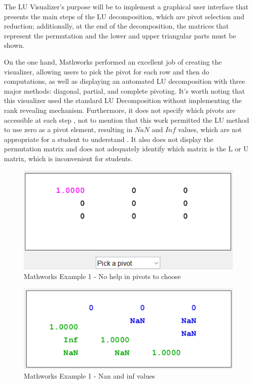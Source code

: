 The LU Visualizer's purpose will be to implement a graphical user interface that presents the main steps of the LU decomposition, which are pivot selection and reduction; additionally, at the end of the decomposition, the matrices that represent the permutation and the lower and upper triangular parts must be shown. 

On the one hand, Mathworks performed an excellent job of creating the visualizer, allowing users to pick the pivot for each row and then do computations, as well as displaying an automated LU decomposition with three major methods: diagonal, partial, and complete pivoting. It's worth noting that this visualizer used the standard LU Decomposition without implementing the rank revealing mechanism. Furthermore, it does not specify which pivots are accessible at each step , not to mention that this work permitted the LU method to use zero as a pivot element, resulting in $NaN$ and $Inf$ values, which are not appropriate for a student to understand . It also does not display the permutation matrix and does not adequately identify which matrix is the L or U matrix, which is inconvenient for students.

 
\begin{figure}[H]
    \centering
    \includegraphics[scale=0.7]{Include/Images/Thesis/Development/Visualizers/LU VISUALIZER/Mathworks.LU.Ex1.png}
    \caption{Mathworks Example 1 - No help in pivots to choose}
    \label{fig:Mathworks Example 1 - No help in pivots to choose}
\end{figure}

\begin{figure}[H]
    \centering
    \includegraphics[scale=0.7]{Include/Images/Thesis/Development/Visualizers/LU VISUALIZER/Mathworks.LU.Ex1.1.png}
    \caption{Mathworks Example 1 - Nan and inf values}
    \label{fig:Mathworks Example 1 - Nan and inf values}
\end{figure}


